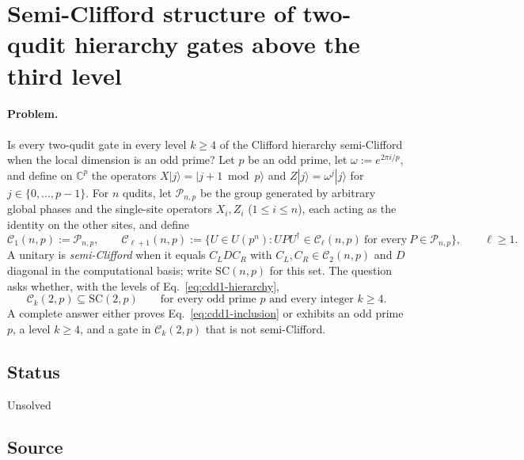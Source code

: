 \section{Semi-Clifford structure of two-qudit hierarchy gates above the third level}
\label{sec:op_cdd1f718ccfbccf6}

\paragraph{Problem.}
Is every two-qudit gate in every level $k\geq4$ of the Clifford hierarchy
semi-Clifford when the local dimension is an odd prime?  Let $p$ be an odd
prime, let $\omega:=e^{2\pi i/p}$, and define on $\mathbb{C}^p$ the operators
$X|j\rangle=|j+1\bmod p\rangle$ and $Z|j\rangle=\omega^j|j\rangle$ for
$j\in\{0,\ldots,p-1\}$.  For $n$ qudits, let $\mathcal{P}_{n,p}$ be the group
generated by arbitrary global phases and the single-site operators $X_i,Z_i$
($1\leq i\leq n$), each acting as the identity on the other sites, and define
\begin{equation}
  \mathcal{C}_1(n,p):=\mathcal{P}_{n,p},
  \qquad
  \mathcal{C}_{\ell+1}(n,p):=
  \bigl\{U\in U(p^n):UPU^\dagger\in\mathcal{C}_\ell(n,p)
  \ \text{for every}\ P\in\mathcal{P}_{n,p}\bigr\},
  \qquad \ell\geq1.
  \label{eq:cdd1-hierarchy}
\end{equation}
A unitary is \emph{semi-Clifford} when it equals $C_LDC_R$ with
$C_L,C_R\in\mathcal{C}_2(n,p)$ and $D$ diagonal in the computational basis;
write $\mathrm{SC}(n,p)$ for this set.  The question asks whether, with the
levels of Eq.~\eqref{eq:cdd1-hierarchy},
\begin{equation}
  \mathcal{C}_k(2,p)\subseteq\mathrm{SC}(2,p)
  \qquad\text{for every odd prime }p\text{ and every integer }k\geq4.
  \label{eq:cdd1-inclusion}
\end{equation}
A complete answer either proves Eq.~\eqref{eq:cdd1-inclusion} or exhibits an
odd prime $p$, a level $k\geq4$, and a gate in $\mathcal{C}_k(2,p)$ that is not
semi-Clifford.

\subsection*{Status}

Unsolved

\subsection*{Source}

